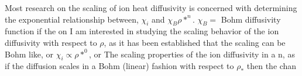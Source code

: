\documentclass{article}
\begin{document}
Most research on the scaling of ion heat diffusivity is concerned with determining the exponential relationship between,  $\chi_i$ and $\chi_B\rho*^{n}$. $\chi_B = $ Bohm diffusivity function if the   on  I am interested in studying the scaling behavior of the ion diffusivity with respect to $\rho$, as it has been established that the scaling can be Bohm like, or $\chi_i \propto  \rho*^0$, or  The scaling properties of the ion diffusivity in a n, as if the diffusion scales in a Bohm (linear) fashion with respect to $\rho_*$ then the chan

\end{document}
